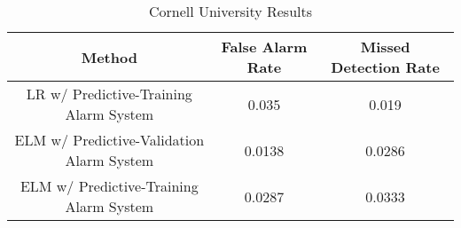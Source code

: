 \begin{table*}[th!]
\centering
\caption{Cornell University Results}
    \label{table:cornellresults}
    \begin{tabular}{|c|c|c|}
        \hline
        Method & False Alarm Rate & Missed Detection Rate \\
        \hline
        \hline
        LR w/ Predictive-Training Alarm System & 0.035 & 0.019 \\
        \hline
        ELM w/ Predictive-Validation Alarm System & 0.0138 & 0.0286 \\
        \hline
        ELM w/ Predictive-Training Alarm System & 0.0287 & 0.0333 \\
        \hline
    \end{tabular}
\end{table*}
